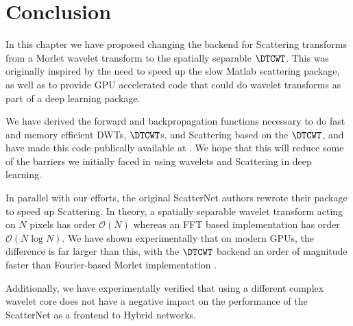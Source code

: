 \section{Conclusion}
In this chapter we have proposed changing the backend for Scattering transforms
from a Morlet wavelet transform to the spatially separable $\DTCWT$. This was
originally inspired by the need to speed up the slow Matlab scattering package,
as well as to provide GPU accelerated code that could do wavelet transforms as part
of a deep learning package.

We have derived the forward and backpropagation functions necessary to do 
fast and memory efficient DWTs, $\DTCWT$s, and Scattering based on the $\DTCWT$, 
and have made this code publically available at \cite{cotter_pytorch_2018}. We
hope that this will reduce some of the barriers we initially faced in using wavelets and
Scattering in deep learning.

In parallel with our efforts, the original ScatterNet authors rewrote their
package to speed up Scattering. In theory, a spatially separable wavelet
transform acting on $N$ pixels has order $\mathcal{O}(N)$ whereas an FFT based
implementation has order $\mathcal{O}(N \log N)$. We have shown experimentally
that on modern GPUs, the difference is far larger than this, with the $\DTCWT$
backend an order of magnitude faster than Fourier-based Morlet implementation
\cite{andreux_kymatio:_2018}.

Additionally, we have experimentally verified that using a different complex
wavelet core does not have a negative impact on the performance of the
ScatterNet as a frontend to Hybrid networks. 
